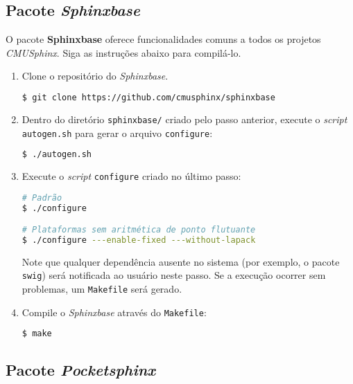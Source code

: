 
\subsection{Pacote \textit{Sphinxbase}}
\label{sphinxbaseCompile}

O pacote \textbf{Sphinxbase} oferece funcionalidades comuns a todos os projetos \textit{CMUSphinx}. Siga as instruções abaixo para compilá-lo.

\begin{enumerate}
\item Clone o repositório do \textit{Sphinxbase}.

\begin{lstlisting}[language=Bash]
$ git clone https://github.com/cmusphinx/sphinxbase
\end{lstlisting}

\item Dentro do diretório \texttt{sphinxbase/} criado pelo passo anterior, execute o \textit{script} \texttt{autogen.sh} para gerar o arquivo \texttt{configure}:

\begin{lstlisting}[language=Bash]
$ ./autogen.sh
\end{lstlisting}

\item Execute o \textit{script} \texttt{configure} criado no último passo:

\begin{lstlisting}[language=Bash]
# Padrão
$ ./configure

# Plataformas sem aritmética de ponto flutuante
$ ./configure ---enable-fixed ---without-lapack
\end{lstlisting}

Note que qualquer dependência ausente no sistema (por exemplo, o pacote \texttt{swig}) será notificada ao usuário neste passo. Se a execução ocorrer sem problemas, um \texttt{Makefile} será gerado.

\item Compile o \textit{Sphinxbase} através do \texttt{Makefile}:
\begin{lstlisting}[language=Bash]
$ make
\end{lstlisting}
\end{enumerate}


\subsection{Pacote \textit{Pocketsphinx}}
\label{pocketsphinxCompile}

